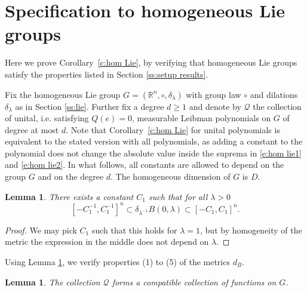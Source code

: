 \documentclass[12pt,reqno,a4paper,dvipsnames]{amsart}
\theoremstyle{plain}
\newtheorem{lemma}[theorem]{Lemma}
\theoremstyle{definition}
\numberwithin{theorem}{section}
\numberwithin{equation}{section}
\newcommand{\R}{\mathbb{R}}
\newcommand{\AD}{D}
\begin{document}
\section{Specification to homogeneous Lie groups}\label{s:lie}
 
Here we prove Corollary~\ref{c:hom Lie}, by verifying that homogeneous Lie groups satisfy the properties listed in Section \ref{ss:setup results}. 

Fix the homogeneous Lie group $G = (\R^n, \circ, \delta_\lambda)$ with group law $\circ$ and dilations $\delta_\lambda$ as in Section \ref{ss:lie}. Further fix a degree $d \ge 1$ and denote by $\mathcal{Q}$ the collection of unital, i.e. satisfying $Q(e) = 0$, measurable Leibman polynomials on $G$ of degree at most $d$. Note that Corollary~\ref{c:hom Lie} for unital polynomials is equivalent to the stated version with all polynomials, as adding a constant to the polynomial does not change the absolute value inside the suprema in \eqref{e:hom lie1} and \eqref{e:hom lie2}.
In what follows, all constants are allowed to depend on the group $G$ and on the degree $d$. The homogeneous dimension of $G$ is $\AD$.

\begin{lemma}\label{l: comp ball}There exists a constant $C_1$ such that for all $\lambda > 0$
    \[
        [-C_1^{-1}, C_1^{-1}]^n \subset \delta_{\lambda^{-1}} B(0, \lambda) \subset  [-C_1, C_1]^n.
    \]
\end{lemma}

\begin{proof}
    We may pick $C_1$ such that this holds for $\lambda  = 1$, but by homogeneity of the metric the expression in the middle does not depend on $\lambda$.
\end{proof}

Using Lemma \ref{l: comp ball}, we verify properties (1) to (5) of the metrics $d_B$. 

\begin{lemma}
    The collection $\mathcal{Q}$ forms a compatible collection of functions on $G$.
\end{lemma}
\end{document}
